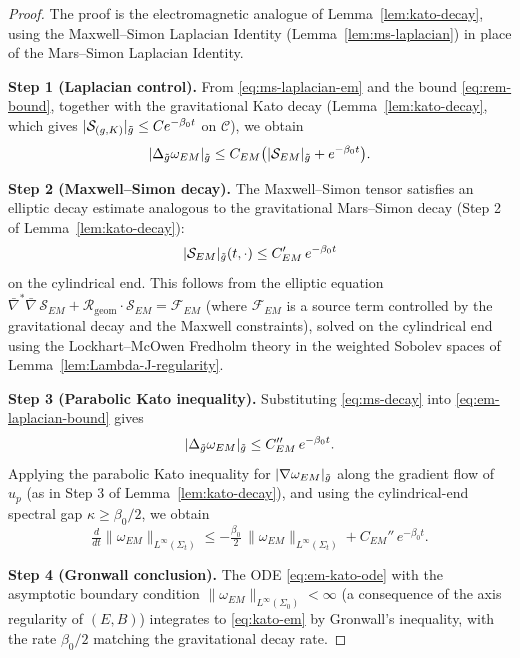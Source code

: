\begin{proof}
The proof is the electromagnetic analogue of Lemma~\ref{lem:kato-decay}, using the Maxwell--Simon Laplacian Identity (Lemma~\ref{lem:ms-laplacian}) in place of the Mars--Simon Laplacian Identity.

\textbf{Step 1 (Laplacian control).} From \eqref{eq:ms-laplacian-em} and the bound \eqref{eq:rem-bound}, together with the gravitational Kato decay (Lemma~\ref{lem:kato-decay}, which gives $|\mathcal{S}_{(g,K)}|_{\tilde{g}}\leq C e^{-\beta_0 t}$ on $\mathcal{C}$), we obtain
\begin{equation}\label{eq:em-laplacian-bound}
|\Delta_{\tilde{g}} \omega_{EM}|_{\tilde{g}} \leq C_{EM}\bigl(|\mathcal{S}_{EM}|_{\tilde{g}} + e^{-\beta_0 t}\bigr).
\end{equation}

\textbf{Step 2 (Maxwell--Simon decay).} The Maxwell--Simon tensor satisfies an elliptic decay estimate analogous to the gravitational Mars--Simon decay (Step 2 of Lemma~\ref{lem:kato-decay}):
\begin{equation}\label{eq:ms-decay}
|\mathcal{S}_{EM}|_{\tilde{g}}(t, \cdot) \leq C_{EM}'\,e^{-\beta_0 t}
\end{equation}
on the cylindrical end. This follows from the elliptic equation $\bar\nabla^*\bar\nabla\,\mathcal{S}_{EM} + \mathcal{R}_{\mathrm{geom}}\cdot\mathcal{S}_{EM} = \mathcal{F}_{EM}$ (where $\mathcal{F}_{EM}$ is a source term controlled by the gravitational decay and the Maxwell constraints), solved on the cylindrical end using the Lockhart--McOwen Fredholm theory \cite{lockhartmccowen1985} in the weighted Sobolev spaces of Lemma~\ref{lem:Lambda-J-regularity}.

\textbf{Step 3 (Parabolic Kato inequality).} Substituting \eqref{eq:ms-decay} into \eqref{eq:em-laplacian-bound} gives
\begin{equation}\label{eq:em-laplacian-decay}
|\Delta_{\tilde{g}} \omega_{EM}|_{\tilde{g}} \leq C_{EM}''\,e^{-\beta_0 t}.
\end{equation}
Applying the parabolic Kato inequality for $|\nabla\omega_{EM}|_{\tilde{g}}$ along the gradient flow of $u_p$ (as in Step 3 of Lemma~\ref{lem:kato-decay}), and using the cylindrical-end spectral gap $\kappa \geq \beta_0/2$, we obtain
\begin{equation}\label{eq:em-kato-ode}
\tfrac{d}{dt} \|\omega_{EM}\|_{L^\infty(\Sigma_t)} \leq -\tfrac{\beta_0}{2}\,\|\omega_{EM}\|_{L^\infty(\Sigma_t)} + C_{EM}''\,e^{-\beta_0 t}.
\end{equation}

\textbf{Step 4 (Gronwall conclusion).} The ODE \eqref{eq:em-kato-ode} with the asymptotic boundary condition $\|\omega_{EM}\|_{L^\infty(\Sigma_0)}<\infty$ (a consequence of the axis regularity of $(E, B)$) integrates to \eqref{eq:kato-em} by Gronwall's inequality, with the rate $\beta_0/2$ matching the gravitational decay rate.
\end{proof}

